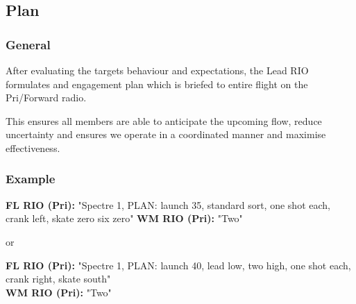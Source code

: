 \subsection{Plan}



\subsubsection*{General}

After evaluating the targets behaviour and expectations, the Lead RIO formulates
and engagement plan which is briefed to entire flight on the Pri/Forward radio.

This ensures all members are able to anticipate the upcoming flow, reduce
uncertainty and ensures we operate in a coordinated manner and maximise
effectiveness.

\subsubsection*{Example}

\textbf{FL RIO (Pri):} "Spectre 1, PLAN: launch 35, standard sort, one
  shot each, crank left, skate zero six zero"
\textbf{WM RIO (Pri):} "Two"

or

\textbf{FL RIO (Pri):} "Spectre 1, PLAN: launch 40, lead low, two high, one
  shot each, crank right, skate south"\\
\textbf{WM RIO (Pri):} "Two"